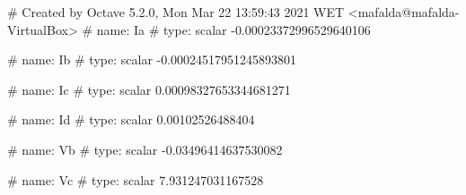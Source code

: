 # Created by Octave 5.2.0, Mon Mar 22 13:59:43 2021 WET <mafalda@mafalda-VirtualBox>
# name: Ia
# type: scalar
-0.00023372996529640106


# name: Ib
# type: scalar
-0.00024517951245893801


# name: Ic
# type: scalar
0.00098327653344681271


# name: Id
# type: scalar
0.00102526488404


# name: Vb
# type: scalar
-0.03496414637530082


# name: Vc
# type: scalar
7.931247031167528


